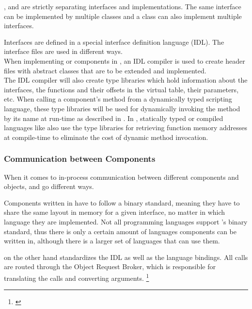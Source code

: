 ,  and  are strictly separating interfaces and implementations. The same interface can be implemented by multiple classes and a class can also implement multiple interfaces.

Interfaces are defined in a special interface definition language (IDL). The interface files are used in different ways.\\
When implementing  or  components in , an IDL compiler is used to create header files with abstract classes that are to be extended and implemented.\\
The IDL compiler will also create type libraries which hold information about the interfaces, the functions and their offsets in the virtual table, their parameters, etc. When calling a component's method from a dynamically typed scripting language, these type libraries will be used for dynamically invoking the method by its name at run-time as described in . In , statically typed or compiled languages like  also use the type libraries for retrieving function memory addresses at compile-time to eliminate the cost of dynamic method invocation.  

\subsubsection{Communication between Components}

When it comes to in-process communication between different components and objects,  and  go different ways. 

Components written in  have to follow a binary standard, meaning they have to share the same layout in memory for a given interface, no matter in which language they are implemented. Not all programming languages support 's binary standard, thus there is only a certain amount of languages  components can be written in, although there is a larger set of languages that can use them.

 on the other hand standardizes the IDL as well as the language bindings. All calls are routed through the Object Request Broker, which is responsible for translating the calls and converting arguments. \footnote{\citep[83]{ComponentTechnology}}

